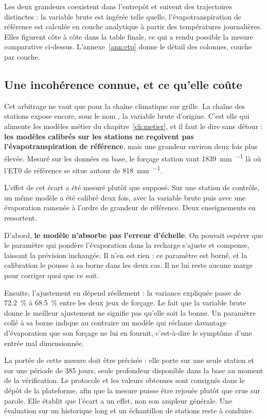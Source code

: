 Les deux grandeurs coexistent dans l'entrepôt et suivent des trajectoires distinctes : la
variable brute est ingérée telle quelle, l'évapotranspiration de référence est calculée en
couche analytique à partir des températures journalières. Elles figurent côte à côte dans la
table finale, ce qui a rendu possible la mesure comparative ci-dessus.
L'annexe~\ref{ann:etp} donne le détail des colonnes, couche par couche.

\subsection{Une incohérence connue, et ce qu'elle coûte}

Cet arbitrage ne vaut que pour la chaîne climatique sur grille. La chaîne des stations expose
encore, sous le nom , la variable brute d'origine. C'est elle qui
alimente les modèles métier du chapitre~\ref{ch:metier}, et il faut le dire sans détour :
\textbf{les modèles calibrés sur les stations ne reçoivent pas l'évapotranspiration de
référence}, mais une grandeur environ deux fois plus élevée. Mesuré sur les données en base, le
forçage station vaut \SI{1839}{\milli\metre\per\an} là où l'ET0 de référence se situe autour de
\SI{818}{\milli\metre\per\an}.

L'effet de cet écart a été mesuré plutôt que supposé. Sur une station de contrôle, un même
modèle a été calibré deux fois, avec la variable brute puis avec une évaporation ramenée à
l'ordre de grandeur de référence. Deux enseignements en ressortent.

D'abord, \textbf{le modèle n'absorbe pas l'erreur d'échelle}. On pouvait espérer que le
paramètre qui pondère l'évaporation dans la recharge s'ajuste et compense, laissant la prévision
inchangée. Il n'en est rien : ce paramètre est borné, et la calibration le pousse à sa borne
dans les deux cas. Il ne lui reste aucune marge pour corriger quoi que ce soit.

Ensuite, l'ajustement en dépend réellement : la variance expliquée passe de \SI{72,2}{\percent}
à \SI{68,5}{\percent} entre les deux jeux de forçage. Le fait que la variable brute donne le
meilleur ajustement ne signifie pas qu'elle soit la bonne. Un paramètre collé à sa borne indique
au contraire un modèle qui réclame davantage d'évaporation que son forçage ne lui en fournit,
c'est-à-dire le symptôme d'une entrée mal dimensionnée.

La portée de cette mesure doit être précisée : elle porte sur une seule station et sur une
période de \num{385} jours, seule profondeur disponible dans la base au moment de la
vérification. Le protocole et les valeurs obtenues sont consignés dans le dépôt de la plateforme,
afin que la mesure puisse être rejouée plutôt que crue sur parole. Elle établit que l'écart a un effet, non son ampleur générale. Une évaluation sur
un historique long et un échantillon de stations reste à conduire.

